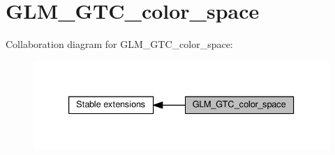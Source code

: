 \hypertarget{group__gtc__color__space}{}\section{G\+L\+M\+\_\+\+G\+T\+C\+\_\+color\+\_\+space}
\label{group__gtc__color__space}
Collaboration diagram for G\+L\+M\+\_\+\+G\+T\+C\+\_\+color\+\_\+space\+:
\nopagebreak
\begin{figure}[H]
\begin{center}
\leavevmode
\includegraphics[width=333pt]{d4/d6d/group__gtc__color__space}
\end{center}
\end{figure}
